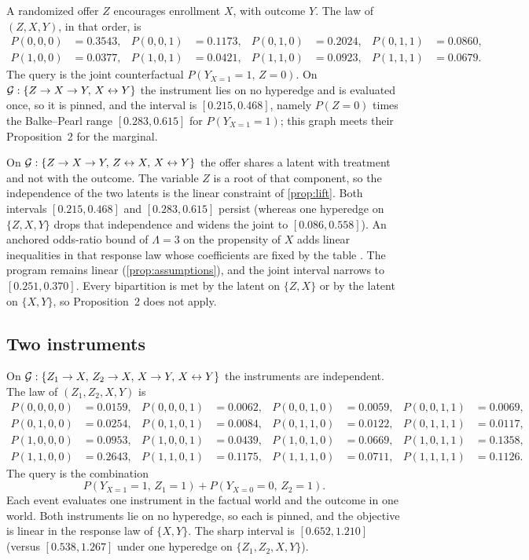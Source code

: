 A randomized offer $Z$ encourages enrollment $X$, with outcome $Y$. The law of $(Z,X,Y)$, in that order, is
\begin{equation}
\label{eq:iv-table}
\begin{aligned}
P(0,0,0)&=0.3543,& P(0,0,1)&=0.1173,& P(0,1,0)&=0.2024,& P(0,1,1)&=0.0860,\\
P(1,0,0)&=0.0377,& P(1,0,1)&=0.0421,& P(1,1,0)&=0.0923,& P(1,1,1)&=0.0679.
\end{aligned}
\end{equation}
The query is the joint counterfactual $P(Y_{X=1}{=}1,\,Z{=}0)$. On $\mathcal{G}:\{Z\to X\to Y,\, X\leftrightarrow Y\}$ the instrument lies on no hyperedge and is evaluated once, so it is pinned, and the interval is $[0.215,0.468]$, namely $P(Z{=}0)$ times the Balke--Pearl range $[0.283,0.615]$ for $P(Y_{X=1}{=}1)$; this graph meets their Proposition~2 for the marginal.

On $\mathcal{G}:\{Z\to X\to Y,\, Z\leftrightarrow X,\, X\leftrightarrow Y\}$ the offer shares a latent with treatment and not with the outcome. The variable $Z$ is a root of that component, so the independence of the two latents is the linear constraint of \cref{prop:lift}. Both intervals $[0.215,0.468]$ and $[0.283,0.615]$ persist (whereas one hyperedge on $\{Z,X,Y\}$ drops that independence and widens the joint to $[0.086,0.558]$). An anchored odds-ratio bound of $\Lambda=3$ on the propensity of $X$ adds linear inequalities in that response law whose coefficients are fixed by the table \citep{tan2006distributional}. The program remains linear (\cref{prop:assumptions}), and the joint interval narrows to $[0.251,0.370]$. Every bipartition is met by the latent on $\{Z,X\}$ or by the latent on $\{X,Y\}$, so Proposition~2 does not apply.

\subsection{Two instruments}
\label{sec:ill-two}

On $\mathcal{G}:\{Z_1\to X,\, Z_2\to X,\, X\to Y,\, X\leftrightarrow Y\}$ the instruments are independent. The law of $(Z_1,Z_2,X,Y)$ is
\begin{equation}
\label{eq:two-iv}
\begin{aligned}
P(0,0,0,0)&=0.0159,& P(0,0,0,1)&=0.0062,& P(0,0,1,0)&=0.0059,& P(0,0,1,1)&=0.0069,\\
P(0,1,0,0)&=0.0254,& P(0,1,0,1)&=0.0084,& P(0,1,1,0)&=0.0122,& P(0,1,1,1)&=0.0117,\\
P(1,0,0,0)&=0.0953,& P(1,0,0,1)&=0.0439,& P(1,0,1,0)&=0.0669,& P(1,0,1,1)&=0.1358,\\
P(1,1,0,0)&=0.2643,& P(1,1,0,1)&=0.1175,& P(1,1,1,0)&=0.0711,& P(1,1,1,1)&=0.1126.
\end{aligned}
\end{equation}
The query is the combination
\[
P(Y_{X=1}{=}1,\,Z_1{=}1)+P(Y_{X=0}{=}0,\,Z_2{=}1).
\]
Each event evaluates one instrument in the factual world and the outcome in one world. Both instruments lie on no hyperedge, so each is pinned, and the objective is linear in the response law of $\{X,Y\}$. The sharp interval is $[0.652,1.210]$ (versus $[0.538,1.267]$ under one hyperedge on $\{Z_1,Z_2,X,Y\}$).

